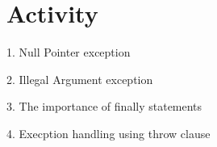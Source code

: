\section{Activity}

1. Null Pointer exception

2. Illegal Argument exception

3. The importance of finally statements

4. Execption handling using throw clause


